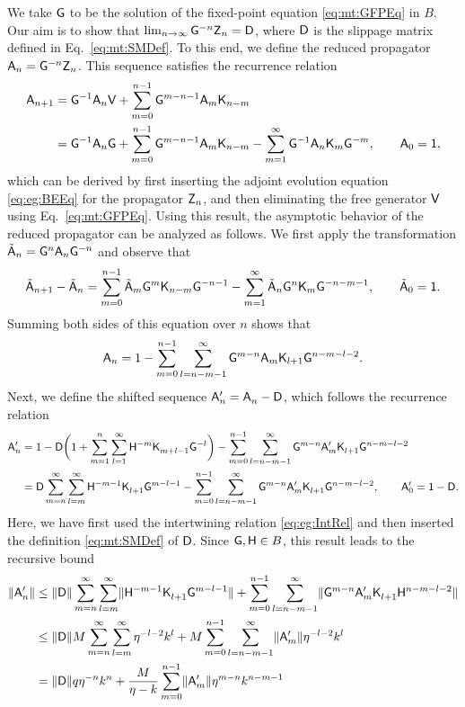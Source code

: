\documentclass[aps,prl,reprint]{revtex4-2}
\begin{document}
We take $\mathsf{G}$ to be the solution of the fixed-point equation \eqref{eq:mt:GFPEq} in $B$.
Our aim is to show that $\lim_{n\rightarrow\infty} \mathsf{G}^{-n}\mathsf{Z}_n = \mathsf{D}$, where $\mathsf{D}$ is the slippage matrix defined in Eq.~\eqref{eq:mt:SMDef}.
To this end, we define the reduced propagator $\mathsf{A}_n = \mathsf{G}^{-n}\mathsf{Z}_n$.
This sequence satisfies the recurrence relation
\begin{align}
\label{eq:lta:rp:RedProRecRel}
\mathsf{A}_{n+1} & = \mathsf{G}^{-1}\mathsf{A}_n\mathsf{V} + \sum_{m=0}^{n-1}\mathsf{G}^{m-n-1}\mathsf{A}_m\mathsf{K}_{n-m}\\
& = \mathsf{G}^{-1}\mathsf{A}_n\mathsf{G} + \sum_{m=0}^{n-1}\mathsf{G}^{m-n-1}\mathsf{A}_m\mathsf{K}_{n-m}
- \sum_{m=1}^\infty \mathsf{G}^{-1}\mathsf{A}_n\mathsf{K}_m\mathsf{G}^{-m},
\qquad \mathsf{A}_0 = \mathsf{1}, \nonumber
\end{align}
which can be derived by first inserting the adjoint evolution equation \eqref{eq:eg:BEEq} for the propagator $\mathsf{Z}_n$, and then eliminating the free generator $\mathsf{V}$ using Eq.~\eqref{eq:mt:GFPEq}.
Using this result, the asymptotic behavior of the reduced propagator can be analyzed as follows.
We first apply the transformation $\tilde{\mathsf{A}}_n = \mathsf{G}^n\mathsf{A}_n\mathsf{G}^{-n}$ and observe that
\begin{equation}
\tilde{\mathsf{A}}_{n+1} - \tilde{\mathsf{A}}_n = \sum_{m=0}^{n-1}\tilde{\mathsf{A}}_m\mathsf{G}^m\mathsf{K}_{n-m}\mathsf{G}^{-n-1}
-\sum_{m=1}^\infty\tilde{\mathsf{A}}_n\mathsf{G}^n\mathsf{K}_m\mathsf{G}^{-n-m-1},
\qquad \tilde{\mathsf{A}}_0 = \mathsf{1}.
\end{equation}
Summing both sides of this equation over $n$ shows that
\begin{equation}\label{eq:lta:RedProRecRel_2}
\mathsf{A}_n = 1 -\sum_{m=0}^{n-1}\sum_{l=n-m-1}^\infty\mathsf{G}^{m-n}\mathsf{A}_m\mathsf{K}_{l+1}\mathsf{G}^{n-m-l-2}.
\end{equation}
Next, we define the shifted sequence $\sA'_n = \sA_n^{\vphp}-\sD$, which follows the recurrence relation
\begin{align}
\sA'_n & = 1 - \sD\biggl(1
+ \sum_{m=1}^{n}\sum_{l=1}^\infty\sH^{-m}\sK_{m+l-1}^{\vphp}\sG^{-l}\biggr)
- \sum_{m=0}^{n-1}\sum_{l=n-m-1}^\infty\sG^{m-n}\sA'_m\sK_{l+1}^{\vphp}\sG^{n-m-l-2}\\
& = \sD\sum_{m=n}^\infty\sum_{l=m}^\infty\sH^{-m-1}\sK_{l+1}^{\vphp}\sG^{m-l-1}
- \sum_{m=0}^{n-1}\sum_{l=n-m-1}^\infty\sG^{m-n}\sA'_m\sK_{l+1}^{\vphp}\sG^{n-m-l-2}, \qquad \sA'_0 = \mathsf{1}-\sD.
\nonumber
\end{align}
Here, we have first used the intertwining relation \eqref{eq:eg:IntRel} and then inserted the definition \eqref{eq:mt:SMDef} of $\mathsf{D}$.
Since $\mathsf{G},\mathsf{H}\in B$, this result leads to the recursive bound
\begin{align}
\nrm{\sA'_n} & \leq \nrm{\sD}\sum_{m=n}^\infty\sum_{l=m}^\infty
\nrm{\sH^{-m-1}\sK_{l+1}^{\vphp}\sG^{m-l-1}}+ \sum_{m=0}^{n-1}\sum_{l=n-m-1}^\infty
\nrm{\sG^{m-n}\sA'_m\sK_{l+1}^{\vphp}\sH^{n-m-l-2}}\\
& \leq \nrm{\sD}M\sum_{m=n}^\infty\sum_{l=m}^\infty
\eta^{-l-2}k^l
+M\sum_{m=0}^{n-1}\sum_{l=n-m-1}^\infty \nrm{\sA'_m}\eta^{-l-2}k^l \nonumber\\
& = \nrm{\sD}q\eta^{-n}k^n
+\frac{M}{\eta-k} \sum_{m=0}^{n-1}\nrm{\sA'_m}\eta^{m-n}k^{n-m-1}\nonumber
\end{align}
\end{document}
